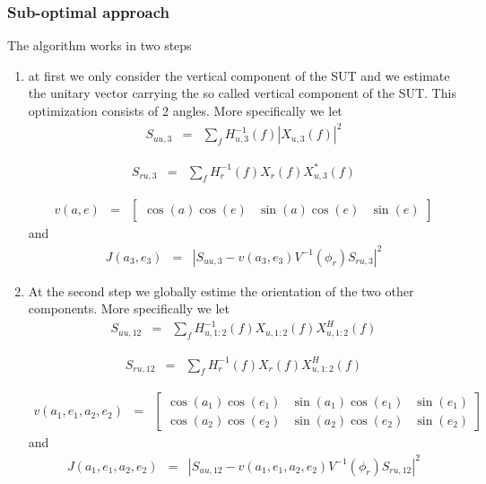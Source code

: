 \documentclass[a4paper, 12pt]{report}
\begin{document}
\subsubsection{Sub-optimal approach}
The algorithm works in two steps
\begin{enumerate}
\item
at first we only consider the vertical component of the SUT and we estimate the unitary vector carrying the so called vertical component of the SUT. This optimization consists of 2 angles. More specifically we let
\begin{eqnarray*}
S_{uu,3}&=&\sum_{f} H_{u,3}^{-1}(f)|X_{u,3}(f)|^{2}
\end{eqnarray*}

\begin{eqnarray*}
S_{ru,3}&=&\sum_{f} H_{r}^{-1}(f)X_{r}(f)X_{u,3}^{*}(f)
\end{eqnarray*}


\begin{eqnarray*}
v(a,e) &=& \begin{bmatrix}
\cos(a)\cos(e)& \sin(a)\cos(e)& \sin(e)
\end{bmatrix}
\end{eqnarray*}
and
\begin{eqnarray*}
J(a_{3},e_{3}) &=&  \left|S_{uu,3} - v(a_{3},e_{3})V^{-1}(\phi_{r})S_{ru,3} \right|^{2}
\end{eqnarray*}

\item

At the second step we globally estime the orientation of the two other components. More specifically we let
\begin{eqnarray*}
S_{uu,12}&=&\sum_{f} H_{u,1:2}^{-1}(f) X_{u,1:2}(f)X^{H}_{u,1:2}(f)
\end{eqnarray*}

\begin{eqnarray*}
S_{ru,12}&=&\sum_{f} H_{r}^{-1}(f)X_{r}(f)X_{u,1:2}^{H}(f)
\end{eqnarray*}


\begin{eqnarray*}
v(a_{1},e_{1},a_{2},e_{2}) &=& \begin{bmatrix}
\cos(a_{1})\cos(e_{1})& \sin(a_{1})\cos(e_{1})& \sin(e_{1})
\\
\cos(a_{2})\cos(e_{2})& \sin(a_{2})\cos(e_{2})& \sin(e_{2})
\end{bmatrix}
\end{eqnarray*}
and
\begin{eqnarray*}
J(a_{1},e_{1},a_{2},e_{2})  &=&  \left|S_{uu,12} - v(a_{1},e_{1},a_{2},e_{2}) V^{-1}(\phi_{r})S_{ru,12} \right|^{2}
\end{eqnarray*}



\end{enumerate}
\end{document}
